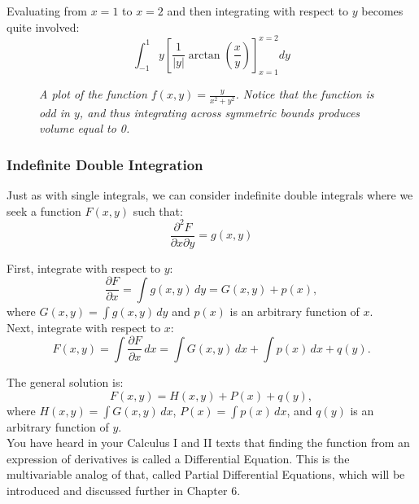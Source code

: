 \begin{example}
\begin{solution}
\noindent Evaluating from $x = 1$ to $x = 2$ and then integrating with respect to $y$ becomes quite involved:
\[
\int_{-1}^1 y\left[\frac{1}{|y|}\arctan\left(\frac{x}{y}\right)\right]_{x=1}^{x=2} dy
\]
\begin{figure}[H]
\centering
{}
\caption{\textit{A plot of the function $f(x,y) = \frac{y}{x^2 + y^2}$. Notice that the function is odd in $y$, and thus integrating across symmetric bounds produces volume equal to 0.}}
\end{figure}
\end{solution}
\end{example}
\exampleline

\subsubsection*{Indefinite Double Integration} 

Just as with single integrals, we can consider indefinite double integrals where we seek a function $F(x,y)$ such that:
\[
\frac{\partial^2 F}{\partial x\partial y} = g(x,y)
\]

\noindent First, integrate with respect to \( y \):
\[
\frac{\partial F}{\partial x} = \int g(x, y) \, dy = G(x, y) + p(x),
\]
where \( G(x, y) = \int g(x, y) \, dy \) and \( p(x) \) is an arbitrary function of \( x \). \\

\noindent Next, integrate with respect to \( x \):
\[
F(x, y) = \int \frac{\partial F}{\partial x} \, dx = \int G(x, y) \, dx + \int p(x) \, dx + q(y).
\]

\noindent The general solution is:
\[
F(x, y) = H(x, y) + P(x) + q(y),
\]
where \( H(x, y) = \int G(x, y) \, dx \), \( P(x) = \int p(x) \, dx \), and \( q(y) \) is an arbitrary function of \( y \). \\
\noindent You have heard in your Calculus I and II texts that finding the function from an expression of derivatives is called a Differential Equation. This is the multivariable analog of that, called Partial Differential Equations, which will be introduced and discussed further in Chapter 6. \\


